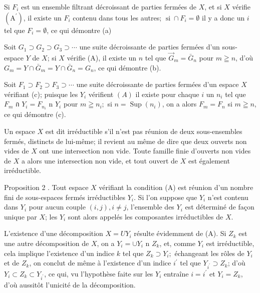 Si $F_{i}$ est un ensemble filtrant décroissant de parties fermées de $X$, et si $X$ vérifie $\left(\mathrm{A}^{\prime}\right)$, il existe un $F_{i}$ contenu dans tous les autres; $\operatorname{si} \cap F_{i}=\emptyset$ il y a donc un $i$ tel que $F_{i}=\emptyset$, ce qui démontre (a)

Soit $G_{1} \supset G_{2} \supset G_{3} \supset \cdots$ une suite décroissante de parties fermées d'un sous-espace $Y$ de $X$; si $X$ vérifie (A), il existe un $n$ tel que $\vec{G}_{m}=\bar{G}_{n}$ pour $m \geqq n$, d'où $G_{m}=Y \cap \bar{G}_{m}=Y \cap \bar{G}_{n}=G_{n}$, ce qui démontre (b).

Soit $F_{1} \supset F_{2} \supset F_{3} \supset \cdots$ une suite décroissante de parties fermées d'un espace $X$ vérifiant (c); puisque les $Y_{i}$ vérifient $(A)$ il existe pour chaque $i$ un $n_{i}$ tel que $F_{m}$ ก $Y_{i}=F_{n_{i}}$ n $Y_{i}$ pour $m \geqq n_{i} ;$ si $n=\operatorname{Sup}\left(n_{i}\right)$, on a alors $F_{m}=F_{n}$ si $m \geqq n$, ce qui démontre (c).

Un espace $X$ est dit irréductible s'il n'est pas réunion de deux sous-ensembles fermés, distincts de lui-même; il revient au même de dire que deux ouverts non vides de $X$ ont une intersection non vide. Toute famille finie d'ouverts non vides de $X$ a alors une intersection non vide, et tout ouvert de $X$ est également irréductible.

Proposition 2 . Tout espace $X$ vérifiant la condition (A) est réunion d'un nombre fini de sous-espaces fermés irréductibles $Y_{i} .$ Si l'on suppose que $Y_{i}$ n'est contenu dans $Y_{i}$ pour aucun couple $(i, j), i \neq j$, l'ensemble des $Y_{i}$ est déterminé de façon unique par $X$; les $Y_{i}$ sont alors appelés les composantes irréductibles de $X$.

L'existence d'une décomposition $X=U Y_{i}$ résulte évidemment de (A). Si $Z_{k}$ est une autre décomposition de $X$, on a $Y_{i}=\cup Y_{i}$ n $Z_{k}$, et, comme $Y_{i}$ est irréductible, cela implique l'existence d'un indice $k$ tel que $Z_{k} \supset Y_{i} ;$ échangeant les rôles de $Y_{i}$ et de $Z_{k}$, on conclut de même à l'existence d'un indice $i^{\prime}$ tel que $Y_{i^{\prime}} \supset Z_{k}$; d'où $Y_{i} \subset Z_{k} \subset Y_{i^{\prime}}$, ce qui, vu l'hypothèse faite sur les $Y_{i}$ entraîne $i=i^{\prime}$ et $Y_{i}=Z_{k}$, d'où aussitôt l'unicité de la décomposition.

